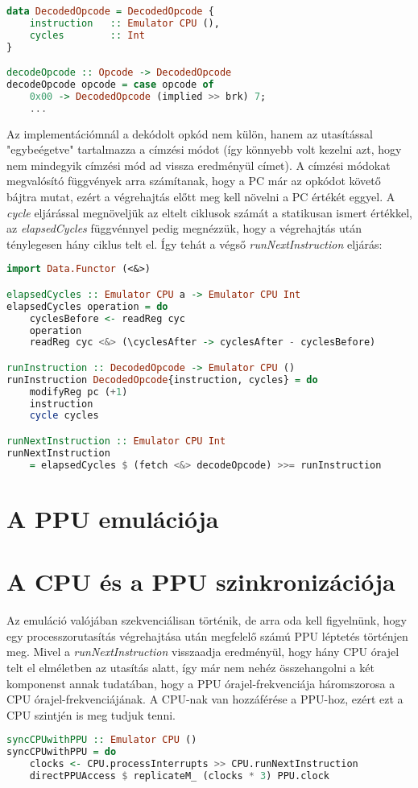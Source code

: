 \begin{lstlisting}[language=Haskell]
data DecodedOpcode = DecodedOpcode {
	instruction   :: Emulator CPU (),
	cycles        :: Int
}

decodeOpcode :: Opcode -> DecodedOpcode
decodeOpcode opcode = case opcode of
	0x00 -> DecodedOpcode (implied >> brk) 7;
	...
\end{lstlisting}
\vspace{0.3cm}
Az implementációmnál a dekódolt opkód nem külön, hanem az utasítással "egybeégetve" tartalmazza a címzési módot (így könnyebb volt kezelni azt, hogy nem mindegyik címzési mód ad vissza eredményül címet). A címzési módokat megvalósító függvények arra számítanak, hogy a PC már az opkódot követő bájtra mutat, ezért a végrehajtás előtt meg kell növelni a PC értékét eggyel.
A \emph{cycle} eljárással megnöveljük az eltelt ciklusok számát a statikusan ismert értékkel, az \emph{elapsedCycles} függvénnyel pedig megnézzük, hogy a végrehajtás után ténylegesen hány ciklus telt el.
Így tehát a végső \emph{runNextInstruction} eljárás:
\vspace{0.3cm}
\begin{lstlisting}[language=Haskell]
import Data.Functor (<&>)

elapsedCycles :: Emulator CPU a -> Emulator CPU Int
elapsedCycles operation = do
	cyclesBefore <- readReg cyc
	operation
	readReg cyc <&> (\cyclesAfter -> cyclesAfter - cyclesBefore)

runInstruction :: DecodedOpcode -> Emulator CPU ()
runInstruction DecodedOpcode{instruction, cycles} = do
	modifyReg pc (+1)
	instruction
	cycle cycles

runNextInstruction :: Emulator CPU Int
runNextInstruction 
 	= elapsedCycles $ (fetch <&> decodeOpcode) >>= runInstruction
\end{lstlisting}

\section{A PPU emulációja}

\section{A CPU és a PPU szinkronizációja}
Az emuláció valójában szekvenciálisan történik, de arra oda kell figyelnünk, hogy egy processzorutasítás végrehajtása után megfelelő számú PPU léptetés történjen meg. Mivel a \emph{runNextInstruction} visszaadja eredményül, hogy hány CPU órajel telt el elméletben az utasítás alatt, így már nem nehéz összehangolni a két komponenst annak tudatában, hogy a PPU órajel-frekvenciája háromszorosa a CPU órajel-frekvenciájának.
A CPU-nak van hozzáférése a PPU-hoz, ezért ezt a CPU szintjén is meg tudjuk tenni.
\begin{lstlisting}[language=Haskell]
syncCPUwithPPU :: Emulator CPU ()
syncCPUwithPPU = do
	clocks <- CPU.processInterrupts >> CPU.runNextInstruction
	directPPUAccess $ replicateM_ (clocks * 3) PPU.clock
\end{lstlisting}

